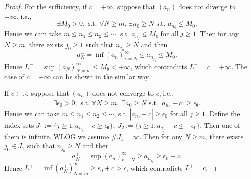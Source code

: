 \begin{proof}
  For the sufficiency, 
  if $c=+\infty$,
  suppose that $(a_{n})$ does not diverge to $+\infty$, i.e.,
  \begin{displaymath}
    \exists M_{0}>0, \text{ s.t. } \forall N\ge m,\
    \exists n_{0}\ge N \text{ s.t. } a_{n_{0}}\le M_{0}.
  \end{displaymath}
  Hence we cam take $m\le n_{1}\le n_{2}\le \cdots$, s.t.
  $a_{n_{j}}\le M_{0}$ for all $j\ge 1$.
  Then for any $N\ge m$, there exists $j_{0}\ge 1$ such that
  $n_{j_{0}}\ge N$ and then
  \begin{displaymath}
    a_{N}^{-}=\inf(a_{n})_{n=N}^{\infty}\le a_{n_{j_{0}}}\le M_{0}.
  \end{displaymath}
  Hence $L^{-}=\sup(a_{N}^{-})_{N=m}^{\infty}\le M_{0}<+\infty$,
  which contradicts $L^{-}=c=+\infty$.
  The case of $c=-\infty$ can be shown in the similar way.

  If $c\in \mathbb{R}$,
  suppose that $(a_{n})$ does not converge to $c$, i.e.,
  \begin{displaymath}
    \exists \epsilon_{0}>0, \text{ s.t. } \forall N\ge m,\ 
    \exists n_{0}\ge N \text{ s.t. } |a_{n_{0}}-c|\ge \epsilon_{0}.
  \end{displaymath}
  Hence we can take $m\le n_{1}\le n_{2}\le \cdots$, s.t.
  $|a_{n_{j}}-c|\ge \epsilon_{0}$ for all $j\ge 1$.
  Define the index sets $J_{1}:=\{j\ge 1:a_{n_{j}}-c\ge \epsilon_{0}\},\
  J_{2}:=\{j\ge 1:a_{n_{j}}-c\le -\epsilon_{0}\}$. Then one of them
  is infinite. WLOG we assume $\# J_{1}=\infty$. Then for any $N\ge m$,
  there exists $j_{0}\in J_{1}$ such that $n_{j_{0}}\ge N$ and then
  \begin{displaymath}
    a_{N}^{+}=\sup(a_{n})_{n=N}^{\infty}
    \ge a_{n_{j_{0}}}\ge \epsilon_{0}+c.
  \end{displaymath}
  Hence $L^{+}=\inf(a_{N}^{+})_{N=m}^{\infty}\ge \epsilon_{0}+c>c$, 
  which contradicts $L^{+}=c$.
\end{proof}

